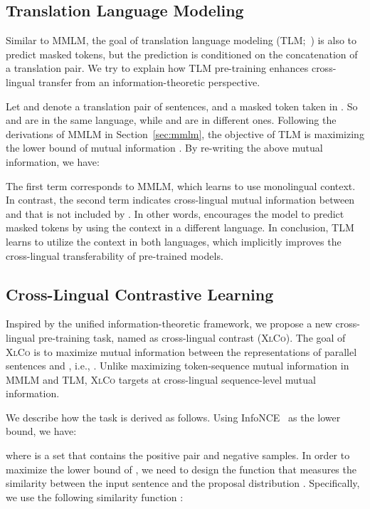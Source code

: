 \documentclass[11pt,a4paper]{article}
\newcommand\xlco{\textsc{XlCo}}
\begin{document}
\subsection{Translation Language Modeling}
\label{sec:tlm}

Similar to MMLM, the goal of translation language modeling (TLM;~\citealt{xlm}) is also to predict masked tokens, but the prediction is conditioned on the concatenation of a translation pair.
We try to explain how TLM pre-training enhances cross-lingual transfer from an information-theoretic perspective.

Let  and  denote a translation pair of sentences, and  a masked token taken in .
So  and  are in the same language, while  and  are in different ones.
Following the derivations of MMLM in Section~\ref{sec:mmlm}, the objective of TLM is maximizing the lower bound of mutual information .
By re-writing the above mutual information, we have:

The first term  corresponds to MMLM, which learns to use monolingual context.
In contrast, the second term  indicates cross-lingual mutual information between  and  that is not included by . 
In other words,  encourages the model to predict masked tokens by using the context in a different language.
In conclusion, TLM learns to utilize the context in both languages, which implicitly improves the cross-lingual transferability of pre-trained models.

\subsection{Cross-Lingual Contrastive Learning}
\label{sec:xlco}

Inspired by the unified information-theoretic framework, we propose a new cross-lingual pre-training task, named as cross-lingual contrast (\xlco{}).
The goal of \xlco{} is to maximize mutual information between the representations of parallel sentences  and , i.e., .
Unlike maximizing token-sequence mutual information in MMLM and TLM, \xlco{} targets at cross-lingual sequence-level mutual information.

We describe how the task is derived as follows.
Using InfoNCE~\cite{infonce} as the lower bound, we have:

where  is a set that contains the positive pair  and  negative samples.
In order to maximize the lower bound of , we need to design the function  that measures the similarity between the input sentence and the proposal distribution .
Specifically, we use the following similarity function :
\end{document}
